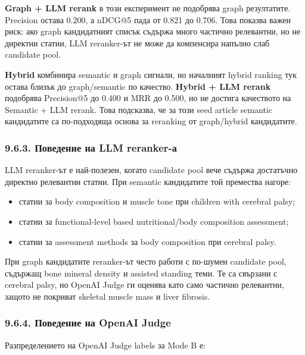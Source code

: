 \documentclass[12pt,a4paper]{article}
\providecommand{\tightlist}{\setlength{\itemsep}{0pt}\setlength{\parskip}{0pt}}
\begin{document}
\textbf{Graph + LLM rerank} в този експеримент не подобрява graph резултатите. Precision остава 0.200, а nDCG@5 пада от 0.821 до 0.706. Това показва важен риск: ако graph кандидатният списък съдържа много частично релевантни, но не директни статии, LLM reranker-ът не може да компенсира напълно слаб candidate pool.

\textbf{Hybrid} комбинира semantic и graph сигнали, но началният hybrid ranking тук остава близък до graph/semantic по качество. \textbf{Hybrid + LLM rerank} подобрява Precision@5 до 0.400 и MRR до 0.500, но не достига качеството на Semantic + LLM rerank. Това подсказва, че за този seed article semantic кандидатите са по-подходяща основа за reranking от graph/hybrid кандидатите.

\subsubsection{9.6.3. Поведение на LLM reranker-а}\label{ux43fux43eux432ux435ux434ux435ux43dux438ux435-ux43dux430-llm-reranker-ux430-1}

LLM reranker-ът е най-полезен, когато candidate pool вече съдържа достатъчно директно релевантни статии. При semantic кандидатите той премества нагоре:

\begin{itemize}
\tightlist
\item
  статии за body composition и muscle tone при children with cerebral palsy;
\item
  статии за functional-level based nutritional/body composition assessment;
\item
  статии за assessment methods за body composition при cerebral palsy.
\end{itemize}

При graph кандидатите reranker-ът често работи с по-шумен candidate pool, съдържащ bone mineral density и assisted standing теми. Те са свързани с cerebral palsy, но OpenAI Judge ги оценява като само частично релевантни, защото не покриват skeletal muscle mass и liver fibrosis.

\subsubsection{9.6.4. Поведение на OpenAI Judge}\label{ux43fux43eux432ux435ux434ux435ux43dux438ux435-ux43dux430-openai-judge-1}

Разпределението на OpenAI Judge labels за Mode B е:
\end{document}
